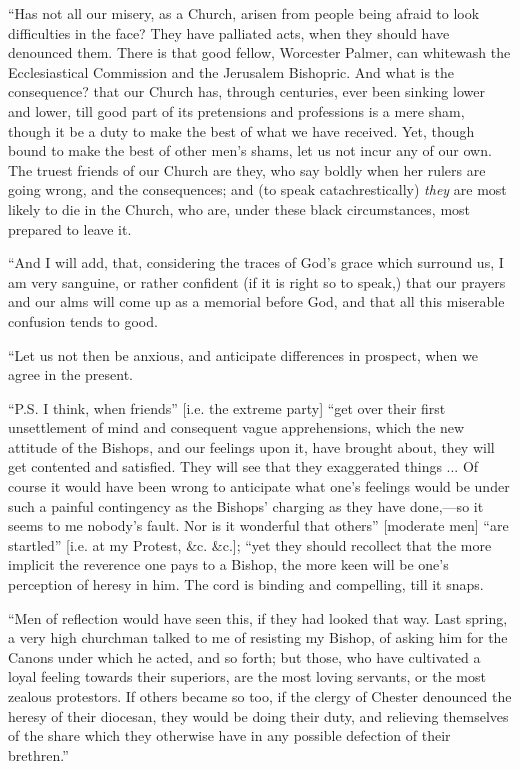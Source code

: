 ``Has not all our misery, as a Church, arisen from people being
afraid to look difficulties in the face? They have palliated acts, when
they should have denounced them. There is that good fellow, Worcester
Palmer, can whitewash the Ecclesiastical Commission and the Jerusalem
Bishopric. And what is the consequence? that our Church has, through
centuries, ever been sinking lower and lower, till good part of its
pretensions and professions is a mere sham, though it be a duty to make
the best of what we have received. Yet, though bound to make the best of
other men's shams, let us not incur any of our own. The truest friends
of our Church are they, who say boldly when her rulers are going wrong,
and the consequences; and (to speak catachrestically) \emph{they} are
most likely to die in the Church, who are, under these black
circumstances, most prepared to leave it.

``And I will add, that, considering the traces of God's grace
which surround us, I am very sanguine, or rather confident (if it is
right so to speak,) that our prayers and our alms will come up as a
memorial before God, and that all this miserable confusion tends to
good.

``Let us not then be anxious, and anticipate differences in
prospect, when we agree in the present.

``P.S. I think, when friends'' [i.e. the extreme party]
``get over their first unsettlement of mind and consequent vague
apprehensions, which the new attitude of the Bishops, and our feelings
upon it, have brought about, they will get contented and satisfied. They
will see that they exaggerated things ... Of course it would have been
wrong to anticipate what one's feelings would be under such a painful
contingency as the Bishops' charging as they have done,—so it seems to me
nobody's fault. Nor is it wonderful that others'' [moderate men]
``are startled'' [i.e. at my Protest, \&c. \&c.]; ``yet they should recollect that the more implicit the
reverence one pays to a Bishop, the more keen will be one's perception
of heresy in him. The cord is binding and compelling, till it snaps.

``Men of reflection would have seen this, if they had looked that
way. Last spring, a very high churchman talked to me of resisting my
Bishop, of asking him for the Canons under which he acted, and so forth;
but those, who have cultivated a loyal feeling towards their superiors,
are the most loving servants, or the most zealous protestors. If others
became so too, if the clergy of Chester denounced the heresy of their
diocesan, they would be doing their duty, and relieving themselves of
the share which they otherwise have in any possible defection of their
brethren.''

